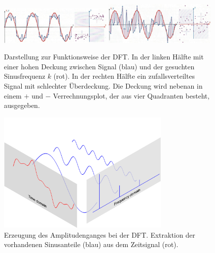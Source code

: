 \begin{figure}
	\centering
	\includegraphics[width=0.49\textwidth]{papers/wavelets/images/2_DFT1.png}
	\includegraphics[width=0.49\textwidth]{papers/wavelets/images/2_DFT2.png}
	\caption{\cite{wavelets:AndreasMuller.2019} Darstellung zur Funktionsweise der DFT. In der linken Hälfte mit einer hohen Deckung zwischen Signal (blau) und der gesuchten Sinusfrequenz $k$ (rot). In der rechten Hälfte ein zufallsverteiltes Signal mit schlechter Überdeckung. Die Deckung wird nebenan in einem $+$ und $-$ Verrechnungsplot, der aus vier Quadranten besteht, ausgegeben.}
	\label{wavelet:fig:2_DFT1&2}
\end{figure}

\begin{figure}
	\centering
	\includegraphics[width=0.75\textwidth]{papers/wavelets/images/3_AmplitudengangExtraktionDFT.png}
	\caption{\cite{wavelets:QingkaiKong} Erzeugung des Amplitudenganges bei der DFT. Extraktion der vorhandenen Sinusanteile (blau) aus dem Zeitsignal (rot).}
	\label{wavelet:fig:AmplitudengangExtraktionDFT}
\end{figure}

